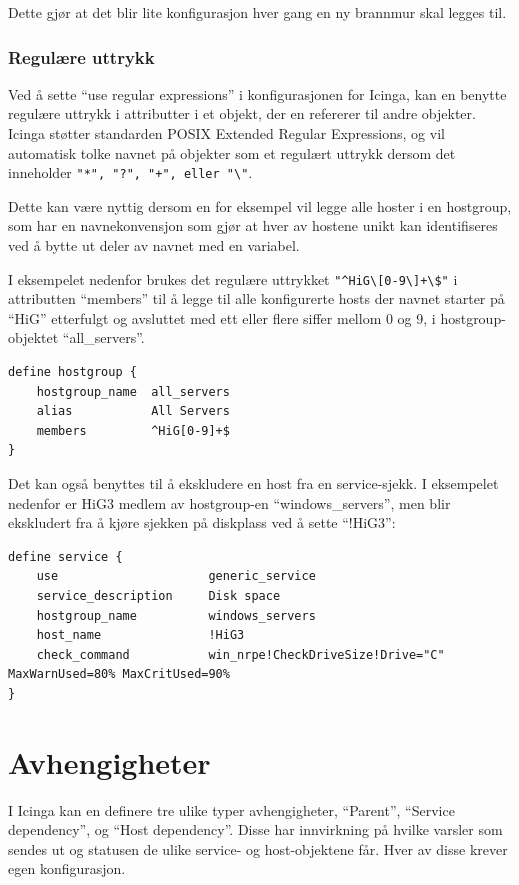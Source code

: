 Dette gjør at det blir lite konfigurasjon hver gang en ny brannmur skal legges til.

\subsubsection{Regulære uttrykk}
Ved å sette ``use regular expressions'' i konfigurasjonen for Icinga, kan en benytte regulære uttrykk i attributter i et objekt, der en refererer til andre objekter. Icinga støtter standarden POSIX Extended Regular Expressions, og vil automatisk tolke navnet på objekter som et regulært uttrykk dersom det inneholder \verb|"*", "?", "+", eller "\"|.

Dette kan være nyttig dersom en for eksempel vil legge alle hoster i en hostgroup, som har en navnekonvensjon som gjør at hver av hostene unikt kan identifiseres ved å bytte ut deler av navnet med en variabel.

\clearpage
I eksempelet nedenfor brukes det regulære uttrykket \verb|"^HiG\[0-9\]+\$"| i attributten ``members'' til å legge til alle konfigurerte hosts der navnet starter på ``HiG'' etterfulgt og avsluttet med ett eller flere siffer mellom 0 og 9, i hostgroup-objektet ``all\_servers''.
\begin{lstlisting}[style=example]
define hostgroup {
    hostgroup_name  all_servers
    alias           All Servers
    members         ^HiG[0-9]+$
}
\end{lstlisting}

Det kan også benyttes til å ekskludere en host fra en service-sjekk. I eksempelet nedenfor er HiG3 medlem av hostgroup-en ``windows\_servers'', men blir ekskludert fra å kjøre sjekken på diskplass ved å sette ``!HiG3'':
\begin{lstlisting}[style=example]
define service {
    use                     generic_service
    service_description	    Disk space
    hostgroup_name          windows_servers
    host_name               !HiG3
    check_command           win_nrpe!CheckDriveSize!Drive="C" MaxWarnUsed=80% MaxCritUsed=90%
}
\end{lstlisting}

\section{Avhengigheter}
I Icinga kan en definere tre ulike typer avhengigheter, ``Parent'', ``Service dependency'', og ``Host dependency''. Disse har innvirkning på hvilke varsler som sendes ut og statusen de ulike service- og host-objektene får. Hver av disse krever egen konfigurasjon. 

